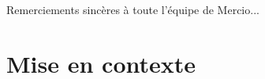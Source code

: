\documentclass{rapportCS}
\begin{document}

\newpage
	
\begin{center}
Remerciements sincères à toute l'équipe de Mercio...
\end{center}

\newpage


\tabledematieres %




\section{Mise en contexte} 
\end{document}
